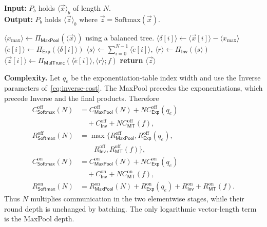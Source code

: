 \documentclass[journal]{IEEEtran}
\theoremstyle{definition}
\theoremstyle{plain}
\newcommand{\ashare}[1]{\langle #1 \rangle}             %
\newcommand{\MulTr}{\Pi_{\mathsf{MulTrunc}}}
\begin{document}
\begin{algorithm}[ht]
  \caption{Softmax ($\Pi_{\text{Softmax}}$)}
  \label{alg:softmax}
  \textbf{Input:} $P_b$ holds $\ashare{\vec{x}}_b$ of length $N$. \\
  \textbf{Output:} $P_b$ holds $\ashare{\vec{z}}_b$ where $\vec{z}=\text{Softmax}(\vec{x})$.
  \begin{algorithmic}[1]
    \State $\ashare{x_{\max}}\leftarrow\Pi_{\mathsf{MaxPool}}(\ashare{\vec{x}})$ using a balanced tree.
      \State $\ashare{\delta[i]}\leftarrow\ashare{\vec{x}[i]}-\ashare{x_{\max}}$
      \State $\ashare{\tilde e[i]}\leftarrow\Pi_{\mathsf{Exp}}(\ashare{\delta[i]})$
    \EndFor
    \State $\ashare s\leftarrow\sum_{i=0}^{N-1}\ashare{\tilde e[i]}$, $\ashare r\leftarrow\Pi_{\mathsf{Inv}}(\ashare s)$
      \State $\ashare{\vec z[i]}\leftarrow\MulTr(\ashare{\tilde e[i]},\ashare r;f)$
    \EndFor
    \State \textbf{return} $\ashare{\vec z}$
  \end{algorithmic}
\end{algorithm}

\textbf{Complexity.} Let $q_e$ be the exponentiation-table index width and
use the Inverse parameters of~\eqref{eq:inverse-cost}. The MaxPool precedes
the exponentiations, which precede Inverse and the final products. Therefore
\begin{equation}
\begin{aligned}
C^{\mathrm{off}}_{\mathsf{Softmax}}(N)
 &=C^{\mathrm{off}}_{\mathsf{MaxPool}}(N)
   +NC^{\mathrm{off}}_{\mathsf{Exp}}(q_e)\\
 &\quad+C^{\mathrm{off}}_{\mathsf{Inv}}
   +NC^{\mathrm{off}}_{\mathsf{MT}}(f),\\
R^{\mathrm{off}}_{\mathsf{Softmax}}(N)
 &=\max\{R^{\mathrm{off}}_{\mathsf{MaxPool}},
          R^{\mathrm{off}}_{\mathsf{Exp}}(q_e),\\
 &\qquad R^{\mathrm{off}}_{\mathsf{Inv}},
          R^{\mathrm{off}}_{\mathsf{MT}}(f)\},\\
C^{\mathrm{on}}_{\mathsf{Softmax}}(N)
 &=C^{\mathrm{on}}_{\mathsf{MaxPool}}(N)
   +NC^{\mathrm{on}}_{\mathsf{Exp}}(q_e)\\
 &\quad+C^{\mathrm{on}}_{\mathsf{Inv}}
   +NC^{\mathrm{on}}_{\mathsf{MT}}(f),\\
R^{\mathrm{on}}_{\mathsf{Softmax}}(N)
 &=R^{\mathrm{on}}_{\mathsf{MaxPool}}(N)
   +R^{\mathrm{on}}_{\mathsf{Exp}}(q_e)
   +R^{\mathrm{on}}_{\mathsf{Inv}}+R^{\mathrm{on}}_{\mathsf{MT}}(f).
\end{aligned}
\label{eq:softmax-cost}
\end{equation}
Thus $N$ multiplies communication in the two elementwise stages, while their
round depth is unchanged by batching. The only logarithmic vector-length term
is the MaxPool depth.




\end{document}
